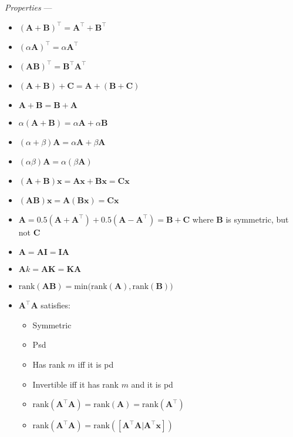 \emph{Properties} ---
\begin{multicols}{2}
\begin{itemize}
    \item $(\boldsymbol{A} + \boldsymbol{B})^\intercal = \boldsymbol{A}^\intercal + \boldsymbol{B}^\intercal$
    \item $(\alpha\boldsymbol{A})^\intercal = \alpha \boldsymbol{A}^\intercal$
    \item $(\boldsymbol{A} \boldsymbol{B})^\intercal = \boldsymbol{B}^\intercal \boldsymbol{A}^\intercal$
    \item $(\boldsymbol{A} + \boldsymbol{B}) + \boldsymbol{C} = \boldsymbol{A} + (\boldsymbol{B} + \boldsymbol{C})$
    \item $\boldsymbol{A} + \boldsymbol{B} = \boldsymbol{B} + \boldsymbol{A}$
    \item $\alpha(\boldsymbol{A} + \boldsymbol{B}) = \alpha\boldsymbol{A} + \alpha\boldsymbol{B}$
    \item $(\alpha + \beta)\boldsymbol{A}= \alpha\boldsymbol{A} + \beta\boldsymbol{A}$
    \item $(\alpha\beta)\boldsymbol{A}= \alpha(\beta\boldsymbol{A})$
    \item $(\boldsymbol{A} + \boldsymbol{B})\boldsymbol{x} = \boldsymbol{A}\boldsymbol{x} + \boldsymbol{B}\boldsymbol{x} = \boldsymbol{C}\boldsymbol{x}$
    \item $(\boldsymbol{A} \boldsymbol{B})\boldsymbol{x} = \boldsymbol{A} (\boldsymbol{B} \boldsymbol{x}) = \boldsymbol{C}\boldsymbol{x}$
    \item $\boldsymbol{A} = 0.5(\boldsymbol{A} + \boldsymbol{A}^\intercal) + 0.5(\boldsymbol{A} - \boldsymbol{A}^\intercal) = \boldsymbol{B} + \boldsymbol{C}$ where $\boldsymbol{B}$ is symmetric, but not $\boldsymbol{C}$
    \item $\boldsymbol{A} = \boldsymbol{A}\boldsymbol{I} = \boldsymbol{I}\boldsymbol{A}$
    \item $\boldsymbol{A}k = \boldsymbol{A}\boldsymbol{K} = \boldsymbol{K}\boldsymbol{A}$
    \item $\textrm{rank}(\boldsymbol{A}\boldsymbol{B}) = \textrm{min(rank}(\boldsymbol{A}), \textrm{rank}(\boldsymbol{B}))$
    \item $\boldsymbol{A}^\intercal\boldsymbol{A}$ satisfies: 
    \begin{itemize}
        \item Symmetric
        \item Psd
        \item Has rank $m$ iff it is pd
        \item Invertible iff it has rank $m$ and it is pd
        \item $\textrm{rank}(\boldsymbol{A}^\intercal\boldsymbol{A}) = \textrm{rank}(\boldsymbol{A}) = \textrm{rank}(\boldsymbol{A}^\intercal)$
        \item $\textrm{rank}(\boldsymbol{A}^\intercal\boldsymbol{A}) = \textrm{rank}([\boldsymbol{A}^\intercal\boldsymbol{A} | \boldsymbol{A}^\intercal\boldsymbol{x}])$
    \end{itemize}
\end{itemize}
\end{multicols}

